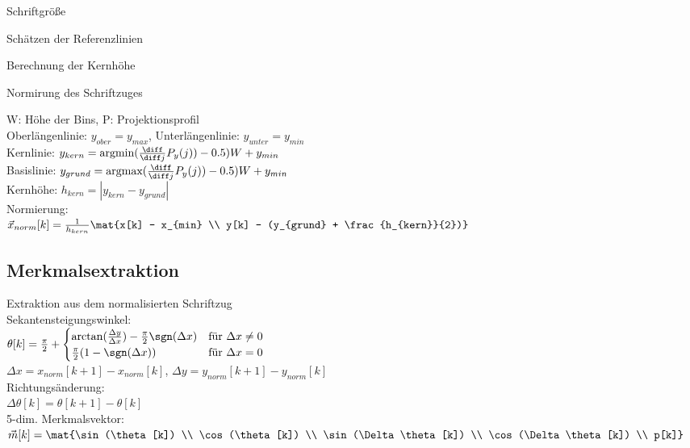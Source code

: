 \documentclass[german,color,6pt]{latex4ei/latex4ei_sheet}
\begin{document}
\begin{sectionbox}
			\begin{cookbox}{Schriftgröße}
				\item Schätzen der Referenzlinien
				\item Berechnung der Kernhöhe
				\item Normirung des Schriftzuges
			\end{cookbox}

			W: Höhe der Bins, P: Projektionsprofil\\
			Oberlängenlinie: $y_{ober} = y_{max}$, Unterlängenlinie: $y_{unter} = y_{min}$\\
			Kernlinie: $y_{kern}  = \text{argmin}(\frac{\diff}{\diff j}P_y(j))-0.5)W+ y_{min}$\\
			Basislinie: $y_{grund} = \text{argmax}(\frac{\diff}{\diff j}P_y(j))-0.5)W+ y_{min}$\\
			Kernhöhe: $h_{kern} = |y_{kern}-y_{grund}|$\\
			Normierung:\\
			$\vec x_{norm}[k] = \frac{1}{h_{kern}} \mat{x[k] - x_{min} \\ y[k] - (y_{grund} + \frac{h_{kern}}{2})}$

\end{sectionbox}

\begin{sectionbox}
	\subsection{Merkmalsextraktion}
		Extraktion aus dem normalisierten Schriftzug\\
		Sekantensteigungswinkel:\\
		$\theta[k] = \frac{\pi}{2} + \begin{cases}\arctan(\frac{\Delta y}{\Delta x}) - \frac{\pi}{2} \sgn(\Delta x) & \text{für } \Delta x \neq 0\\
								     \frac{\pi}{2} (1- \sgn(\Delta x) ) & \text{für } \Delta x = 0 \end{cases}$\\
$\Delta x = x_{norm}[k+1]-x_{norm}[k]$, $\Delta y = y_{norm}[k+1]-y_{norm}[k]$\\
		Richtungsänderung:\\
		$\Delta \theta[k] = \theta[k+1]-\theta[k]$\\
		5-dim. Merkmalsvektor:
		$\vec m[k] = \mat{\sin(\theta[k]) \\ \cos(\theta[k]) \\ \sin(\Delta \theta[k]) \\ \cos(\Delta \theta[k]) \\ p[k]}$

\end{sectionbox}
\end{document}
